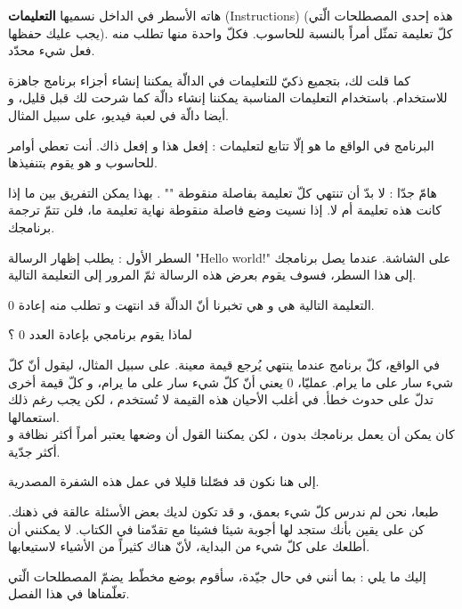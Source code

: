 هاته الأسطر في الداخل نسميها
\textbf{التعليمات}
(\textenglish{Instructions})
 (هذه إحدى المصطلحات الّتي يجب عليك حفظها). كلّ تعليمة تمثّل أمراً بالنسبة للحاسوب. فكلّ واحدة منها تطلب منه فعل شيء محدّد.

 كما قلت لك، بتجميع ذكيّ للتعليمات في الدالّة يمكننا إنشاء أجزاء برنامج جاهزة للاستخدام. باستخدام التعليمات المناسبة يمكننا إنشاء دالّة
 كما شرحت لك قبل قليل، و أيضا دالّة
 في لعبة فيديو، على سبيل المثال.

 البرنامج في الواقع ما هو إلّا تتابع لتعليمات : إفعل هذا و إفعل ذاك. أنت تعطي أوامر للحاسوب و هو يقوم بتنفيذها.

 \begin{critical}
هامّ جدّا : لا بدّ أن تنتهي كلّ تعليمة بفاصلة منقوطة
"\InlineCode{;}"
. بهذا يمكن التفريق بين ما إذا كانت هذه تعليمة أم لا. إذا نسيت وضع فاصلة منقوطة نهاية تعليمة ما، فلن تتمّ ترجمة برنامجك.
 \end{critical}

 السطر الأول :
 يطلب إظهار الرسالة
 "\textenglish{Hello world!}"
  على الشاشة. عندما يصل برنامجك إلى هذا السطر، فسوف يقوم بعرض هذه الرسالة ثمّ المرور إلى التعليمة التالية.

  التعليمة التالية هي
 و هي تخبرنا أنّ الدالّة
 قد انتهت و تطلب منه إعادة 0.

 \begin{question}
   لماذا يقوم برنامجي بإعادة العدد 0 ؟
 \end{question}

 في الواقع، كلّ برنامج عندما ينتهي يُرجع قيمة معينة. على سبيل المثال، ليقول أنّ كلّ شيء سار على ما يرام. عمليّا، 0 يعني  أنّ كلّ شيء سار على ما يرام، و كلّ قيمة أخرى تدلّ على حدوث خطأ. في أغلب الأحيان هذه القيمة لا تُستخدم ، لكن يجب رغم ذلك استعمالها.\\
 كان يمكن أن يعمل برنامجك بدون
، لكن يمكننا القول أن وضعها يعتبر أمراً أكثر نظافة و أكثر جدّية.

إلى هنا نكون قد فصّلنا قليلا في عمل هذه الشفرة المصدرية.

طبعا، نحن لم ندرس كلّ شيء بعمق، و قد تكون لديك بعض الأسئلة عالقة في ذهنك. كن على يقين بأنك ستجد لها أجوبة شيئا فشيئا مع تقدّمنا في الكتاب. لا يمكنني أن أطلعك على كلّ شيء من البداية، لأنّ هناك كثيراً من الأشياء لاستيعابها.

إليك ما يلي : بما أنني في حال جيّدة، سأقوم بوضع مخطّط يضمّ المصطلحات الّتي تعلّمناها في هذا الفصل.

